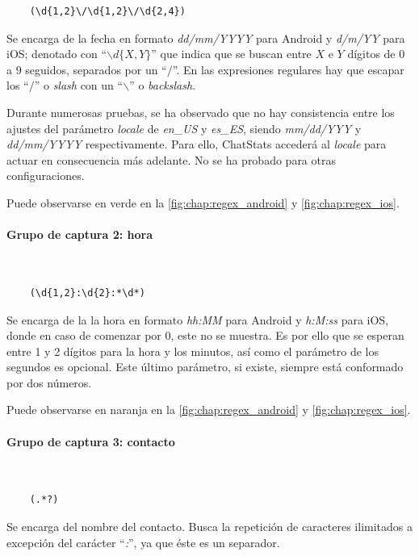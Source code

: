 \begin{lstlisting}
	(\d{1,2}\/\d{1,2}\/\d{2,4})
\end{lstlisting}

Se encarga de la fecha en formato \textit{dd/mm/YYYY} para Android y \textit{d/m/YY} para iOS; denotado con ``$\backslash d\{X,Y\}$'' que indica que se buscan entre $X$ e $Y$ dígitos de $0$ a $9$ seguidos, separados por un ``$/$''. En las expresiones regulares hay que escapar los ``$/$'' o \textit{slash} con un ``$\backslash$'' o \textit{backslash}.

Durante numerosas pruebas, se ha observado que no hay consistencia entre los ajustes del parámetro \textit{locale} de \textit{en\_US} y \textit{es\_ES}, siendo \textit{mm/dd/YYY} y \textit{dd/mm/YYYY} respectivamente. Para ello, ChatStats accederá al \textit{locale} para actuar en consecuencia más adelante. No se ha probado para otras configuraciones.

Puede observarse en verde en la \autoref{fig:chap:regex_android} y \autoref{fig:chap:regex_ios}.

\paragraph{Grupo de captura 2: hora}\mbox{}\\

\begin{lstlisting}
	(\d{1,2}:\d{2}:*\d*)
\end{lstlisting}

Se encarga de la la hora en formato \textit{hh:MM} para Android y \textit{h:M:ss} para iOS, donde en caso de comenzar por 0, este no se muestra. Es por ello que se esperan entre 1 y 2 dígitos para la hora y los minutos, así como el parámetro de los segundos es opcional. Este último parámetro, si existe, siempre está conformado por dos números.

Puede observarse en naranja en la \autoref{fig:chap:regex_android} y \autoref{fig:chap:regex_ios}.

\paragraph{Grupo de captura 3: contacto}\mbox{}\\

\begin{lstlisting}
	(.*?)
\end{lstlisting}

Se encarga del nombre del contacto. Busca la repetición de caracteres ilimitados a excepción del carácter ``\textit{:}'', ya que éste es un separador.

